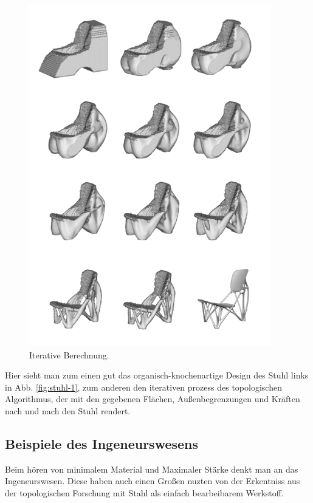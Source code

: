 \documentclass{article}
\begin{document}
\begin{figure}[H]
\begin{minipage}{0.3\textwidth}
               \includegraphics[width=\linewidth]{figures/beispiele/stals-1.png}
               \caption{Iterative Berechnung. \parencite{stals2015}}
               \label{fig:stuhl-2}
            \end{minipage}
        \end{figure}

        Hier sieht man zum einen gut das organisch-knochenartige Design des Stuhl links in Abb. \ref{fig:stuhl-1},
        zum anderen den iterativen prozess des topologischen Algorithmus, der
        mit den gegebenen Fl\"achen, Au\ss{}enbegrenzungen und Kr\"aften nach und nach den Stuhl rendert.
    

    \subsection{Beispiele des Ingeneurswesens}
    Beim h\"oren von minimalem Material und Maximaler St\"arke denkt man an das
    Ingeneurswesen. Diese haben auch einen Gro\ss{}en nuzten von der Erkentniss aus 
    der topologischen Forschung mit Stahl als einfach bearbeibarem Werkstoff.
\end{document}
